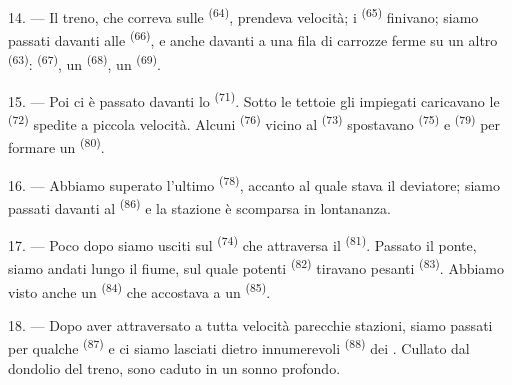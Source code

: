 \VUsaut{3.0mm}
\VUsaut{3.0mm}

14. --- Il treno, che correva sulle  \textsuperscript{(64)}, prendeva
velocità; i  \textsuperscript{(65)} finivano; siamo passati
davanti alle  \textsuperscript{(66)}, e anche davanti a una fila di
carrozze ferme su un altro  \textsuperscript{(63)}:  \textsuperscript{(67)}, un  \textsuperscript{(68)},
un  \textsuperscript{(69)}.


15. --- Poi ci è passato davanti lo  \textsuperscript{(71)}. Sotto
le tettoie gli impiegati caricavano le  \textsuperscript{(72)} spedite a
piccola velocità. Alcuni  \textsuperscript{(76)} vicino al
 \textsuperscript{(73)} spostavano  \textsuperscript{(75)} e  \textsuperscript{(79)} per formare
un  \textsuperscript{(80)}.

16. --- Abbiamo superato l'ultimo  \textsuperscript{(78)}, accanto al
quale stava il deviatore; siamo passati davanti al 
\textsuperscript{(86)} e la stazione è scomparsa in lontananza.

17. --- Poco dopo siamo usciti sul  \textsuperscript{(74)} che
attraversa il  \textsuperscript{(81)}. Passato il ponte, siamo andati
lungo il fiume, sul quale potenti  \textsuperscript{(82)}
tiravano pesanti  \textsuperscript{(83)}. Abbiamo visto anche un
 \textsuperscript{(84)} che accostava a un
 \textsuperscript{(85)}.

18. --- Dopo aver attraversato a tutta velocità parecchie stazioni, siamo passati per
qualche  \textsuperscript{(87)} e ci siamo lasciati dietro
innumerevoli  \textsuperscript{(88)} dei .
Cullato dal dondolio del treno, sono caduto in un sonno profondo.

\VUsaut{3.0mm}
\VUsaut{3.0mm}

